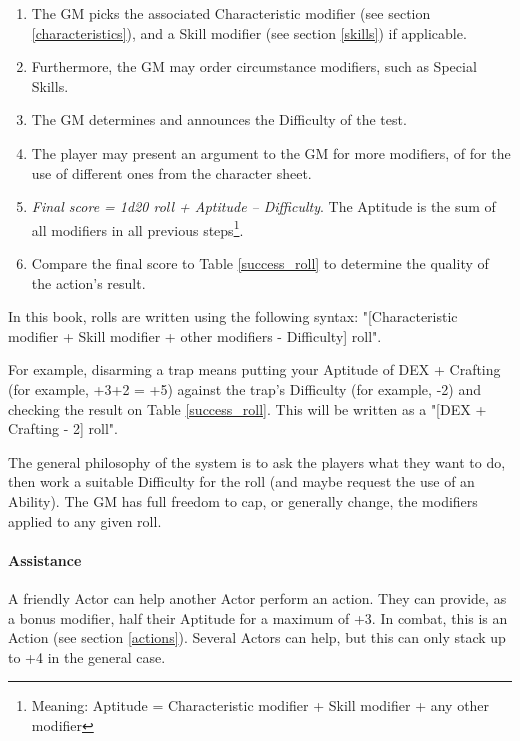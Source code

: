\begin{enumerate}
    \item The GM picks the associated Characteristic modifier (see section \ref{characteristics}), and a Skill modifier (see section \ref{skills}) if applicable. 
    \item Furthermore, the GM may order circumstance modifiers, such as Special Skills.
	\item The GM determines and announces the Difficulty of the test.
    \item The player may present an argument to the GM for more modifiers, of for the use of different ones from the character sheet. 
    \item \textit{Final score = 1d20 roll + Aptitude – Difficulty}. The Aptitude is the sum of all modifiers in all previous steps\footnote{Meaning: Aptitude = Characteristic modifier + Skill modifier + any other modifier}.
    \item Compare the final score to Table \ref{success_roll} to determine the quality of the action's result.
\end{enumerate}


\begin{rpg-examplebox}
	In this book, rolls are written using the following syntax: "[Characteristic modifier + Skill modifier + other modifiers - Difficulty] roll".
\end{rpg-examplebox}

For example, disarming a trap means putting your Aptitude of DEX + Crafting (for example, +3+2 = +5) against the trap's Difficulty (for example, -2) and checking the result on Table \ref{success_roll}. This will be written as a "[DEX + Crafting - 2] roll".

The general philosophy of the system is to ask the players what they want to do, then work a suitable Difficulty for the roll (and maybe request the use of an Ability). The GM has full freedom to cap, or generally change, the modifiers applied to any given roll.


\paragraph{Assistance} 

A friendly Actor can help another Actor perform an action. They can provide, as a bonus modifier, half their Aptitude for a maximum of +3. In combat, this is an Action (see section \ref{actions}). Several Actors can help, but this can only stack up to +4 in the general case.

